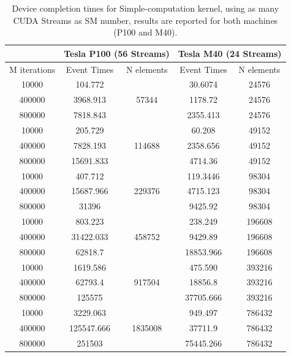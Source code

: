 \begin{table}	
	\centering
	\begin{tabular}{ | c |  c c  | c c | } 
		\hline
		& \multicolumn{2}{c}{\textbf{Tesla P100 (56 Streams)}} & \multicolumn{2}{c}{\textbf{Tesla M40 (24 Streams)}}\\ [0.5ex]
		\hline
		M iterations & Event Times & N elements    &    Event Times & N elements  \\
		\hline\hline
		
		10000 &	104.772& \multirow{3}{*}{57344}& 30.6074& 24576\\
		400000&	3968.913&	&	1178.72	& 24576\\
		800000&	7818.843&	&	2355.413&	24576\\
		\hline
		10000&	205.729&\multirow{3}{*}{114688}& 60.208& 49152\\
		400000&	7828.193&	&	2358.656&	49152\\
		800000&	15691.833&	&	4714.36&	49152\\
		\hline
		10000&	407.712& \multirow{3}{*}{229376}& 119.3446&	98304\\
		400000&	15687.966&	&	4715.123&	98304\\
		800000&	31396&	&	9425.92&	98304\\
		\hline
		10000&	803.223& \multirow{3}{*}{458752}& 238.249&	196608\\
		400000&	31422.033&	&	9429.89&	196608\\
		800000&	62818.7&	&	18853.966&	196608\\
		\hline
		10000&	1619.586& \multirow{3}{*}{917504}&	475.590&	393216\\
		400000&	62793.4&	&	18856.8&	393216\\
		800000&	125575&	&	37705.666&	393216\\
		\hline
		10000&	3229.063& \multirow{3}{*}{1835008}&	949.497 & 786432\\
		400000&	125547.666&	&	37711.9 &	786432\\
		800000&	251503&	&	75445.266&	786432\\
		
		\hline
	\end{tabular}
	\caption{Device completion times for Simple-computation kernel, using as many CUDA Streams as SM number, results are reported for both machines (P100 and M40).}	
	\label{tab:cosavgsSM}		
\end{table}

